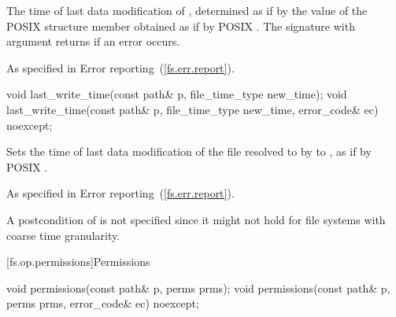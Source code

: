 \begin{itemdescr}
\pnum
\returns The time of last data modification of ,
  determined as if by the value of the POSIX  structure member 
  obtained as if by POSIX .
  The signature with argument  returns 
  if an error occurs.

\pnum
\throws As specified in Error reporting~(\ref{fs.err.report}).
\end{itemdescr}

\begin{itemdecl}
void last_write_time(const path& p, file_time_type new_time);
void last_write_time(const path& p, file_time_type new_time,
                     error_code& ec) noexcept;
\end{itemdecl}

\begin{itemdescr}
\pnum
\effects Sets the time of last data modification of the file
  resolved to by  to , as if by POSIX .

\pnum
\throws As specified in Error reporting~(\ref{fs.err.report}).

\pnum
\enternote A postcondition of  is not specified since it might not hold for file systems
  with coarse time granularity. \exitnote
\end{itemdescr}

[fs.op.permissions]{Permissions}

\begin{itemdecl}
void permissions(const path& p, perms prms);
void permissions(const path& p, perms prms, error_code& ec) noexcept;
\end{itemdecl}

